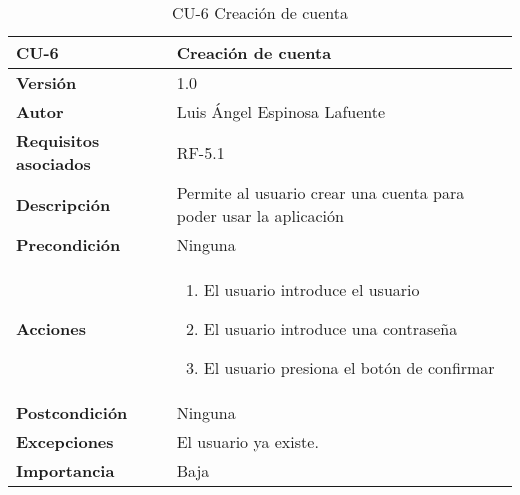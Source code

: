 \begin{table}[p]
	\centering
	\begin{tabularx}{\linewidth}{ p{} p{} }
		\toprule
		\textbf{CU-6}    & \textbf{Creación de cuenta}\\
		\toprule
		\textbf{Versión}              & 1.0    \\
		\textbf{Autor}                &  Luis Ángel Espinosa Lafuente \\
		\textbf{Requisitos asociados} & RF-5.1\\
		\textbf{Descripción}          & Permite al usuario crear una cuenta para poder usar la aplicación\\
		\textbf{Precondición}         & Ninguna\\
		\textbf{Acciones}             &
		\begin{enumerate}
			\def\labelenumi{\arabic{enumi}.}
			\tightlist
			\item El usuario introduce el usuario
			\item El usuario introduce una contraseña
			\item El usuario presiona el botón de confirmar
		\end{enumerate}\\
		\textbf{Postcondición}        & Ninguna \\
		\textbf{Excepciones}          & El usuario ya existe. \\
		\textbf{Importancia}          & Baja \\
		\bottomrule
	\end{tabularx}
	\caption{CU-6 Creación de cuenta}
\end{table}

